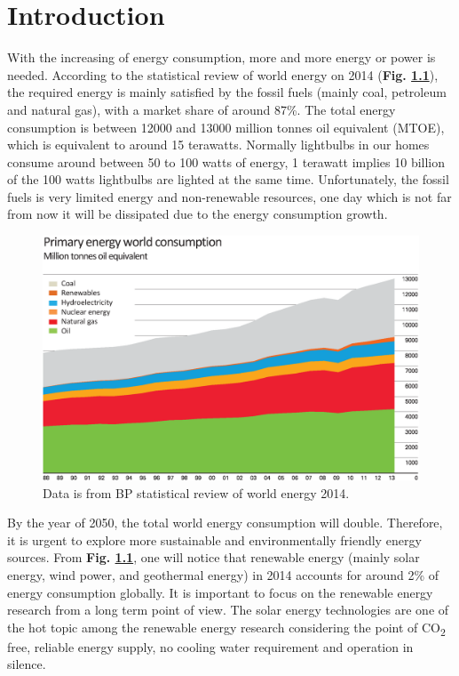 \documentclass[a4paper, 12pt, titlepage,oneside,drop]{kthesis}
\begin{document}
\newpage
{}



\chapter{Introduction}

With the increasing of energy consumption, more and more energy or power is needed. According to the statistical review of world energy on 2014 (\textbf{Fig. \ref{wpec}}),
the required energy is mainly satisfied by the fossil fuels (mainly coal, petroleum and 
natural gas), with a market share of around 87\%. The total energy consumption is between 12000 and 13000 million tonnes oil equivalent (MTOE), which is equivalent to around 15 terawatts. 
Normally lightbulbs in our homes consume around between 50 to 100 watts of energy, 1 terawatt implies 10 billion of the 100 watts lightbulbs are lighted at the same time. 
Unfortunately, the fossil fuels is very limited energy and non-renewable resources, one day which is not far from  now it will be dissipated due to the energy consumption growth.

\begin{figure}[H]
\centering
\includegraphics[scale=0.4]{energy.eps}
\caption{Data is from BP statistical review of world energy 2014.}
\label{wpec}
\end{figure}

By the year of 2050, the total world energy consumption will double. Therefore, it is urgent to explore more sustainable and environmentally friendly energy sources. From \textbf{Fig. \ref{wpec}},
one will notice that renewable energy (mainly solar energy, wind power, and geothermal energy) in 2014 accounts for around 2\% of energy consumption globally. It is important to focus on the renewable energy research from a 
long term point of view. The solar energy technologies are one of the hot topic among the renewable energy research considering the point of CO\textsubscript{2} free, reliable energy supply, no cooling water requirement and
operation in silence.
\end{document}
